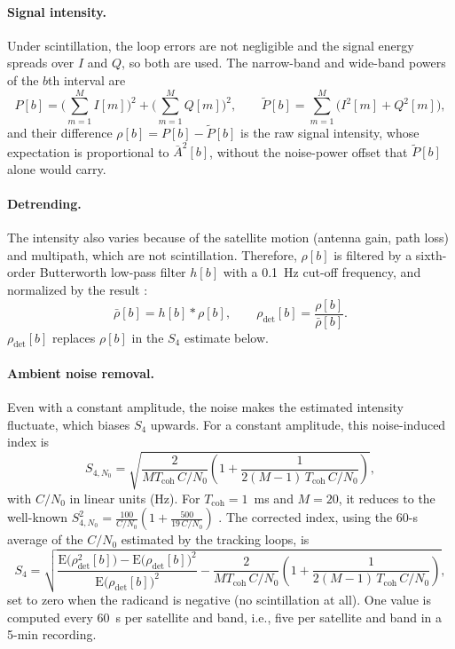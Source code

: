 \documentclass{article}
\begin{document}
\paragraph{Signal intensity.} Under scintillation, the loop errors are not negligible and the signal energy spreads over $I$ and $Q$, so both are used. The narrow-band and wide-band powers of the $b$th interval are \cite{vandierendonckIonosphericScintillationMonitoring1993,wendlerScintillationProcessingSoftware2016}
\begin{equation}
  P[b] = \Big(\sum_{m=1}^{M} I[m]\Big)^2 + \Big(\sum_{m=1}^{M} Q[m]\Big)^2, \qquad
  \tilde P[b] = \sum_{m=1}^{M} \big(I^2[m] + Q^2[m]\big),
\end{equation}
and their difference $\rho[b] = P[b] - \tilde P[b]$ is the raw signal intensity, whose expectation is proportional to $\bar A^2[b]$, without the noise-power offset that $\tilde P[b]$ alone would carry.

\paragraph{Detrending.} The intensity also varies because of the satellite motion (antenna gain, path loss) and multipath, which are not scintillation. Therefore, $\rho[b]$ is filtered by a sixth-order Butterworth low-pass filter $h[b]$ with a 0.1~Hz cut-off frequency, and normalized by the result \cite{vandierendonckIonosphericScintillationMonitoring1993}:
\begin{equation}
  \bar\rho[b] = h[b] * \rho[b], \qquad \rho_\mathrm{det}[b] = \frac{\rho[b]}{\bar\rho[b]}.
\end{equation}
$\rho_\mathrm{det}[b]$ replaces $\rho[b]$ in the $S_4$ estimate below.

\paragraph{Ambient noise removal.} Even with a constant amplitude, the noise makes the estimated intensity fluctuate, which biases $S_4$ upwards. For a constant amplitude, this noise-induced index is \cite{wendlerScintillationProcessingSoftware2016}
\begin{equation}
  S_{4,N_0} = \sqrt{\frac{2}{M T_\mathrm{coh}\, C/N_0} \left(1 + \frac{1}{2(M-1)\, T_\mathrm{coh}\, C/N_0}\right)},
\end{equation}
with $C/N_0$ in linear units (Hz). For $T_\mathrm{coh} = 1$~ms and $M = 20$, it reduces to the well-known $S_{4,N_0}^2 = \frac{100}{C/N_0}\left(1 + \frac{500}{19\, C/N_0}\right)$ \cite{vandierendonckIonosphericScintillationMonitoring1993}. The corrected index, using the 60-s average of the $C/N_0$ estimated by the tracking loops, is
\begin{equation}
  \label{eq:s4-corrected}
  S_4 = \sqrt{\frac{\mathrm{E}\big(\rho_\mathrm{det}^2[b]\big) - \mathrm{E}\big(\rho_\mathrm{det}[b]\big)^2}{\mathrm{E}\big(\rho_\mathrm{det}[b]\big)^2} - \frac{2}{M T_\mathrm{coh}\, C/N_0} \left(1 + \frac{1}{2(M-1)\, T_\mathrm{coh}\, C/N_0}\right)},
\end{equation}
set to zero when the radicand is negative (no scintillation at all). One value is computed every 60~s per satellite and band, i.e., five per satellite and band in a 5-min recording.
\end{document}
